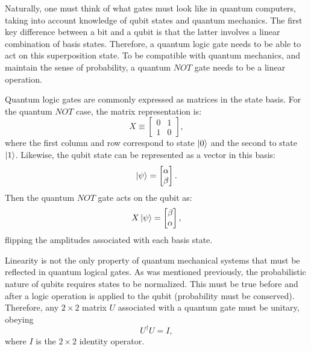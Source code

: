 Naturally, one must think of what gates must look like in quantum computers, taking into account knowledge of qubit states and quantum mechanics. The first key difference between a bit and a qubit is that the latter involves a linear combination of basis states. Therefore, a quantum logic gate needs to be able to act on this superposition state. To be compatible with quantum mechanics, and maintain the sense of probability, a quantum $NOT$ gate needs to be a linear operation.

Quantum logic gates are commonly expressed as matrices in the state basis. For the quantum $NOT$ case, the matrix representation is:
\begin{equation}
    X \equiv \begin{bmatrix}
    0&1\\
    1&0
    \end{bmatrix},
\end{equation}
where the first column and row correspond to state $\ket{0}$ and the second to state $\ket{1}$. Likewise, the qubit state can be represented as a vector in this basis:
\begin{equation}
    \ket{\psi}=\begin{bmatrix}
    \alpha\\
    \beta
    \end{bmatrix}.
\end{equation}
Then the quantum $NOT$ gate acts on the qubit as:
\begin{equation}
    X\ket{\psi} = \begin{bmatrix}
        \beta\\
        \alpha
        \end{bmatrix},
\end{equation}
flipping the amplitudes associated with each basis state.

Linearity is not the only property of quantum mechanical systems that must be reflected in quantum logical gates. As was mentioned previously, the probabilistic nature of qubits requires states to be normalized. This must be true before and after a logic operation is applied to the qubit (probability must be conserved). Therefore, any $2\times 2$ matrix $U$ associated with a quantum gate must be unitary, obeying
\begin{equation}
    U^\dagger U = I,
\end{equation}
where $I$ is the $2\times 2$ identity operator.

